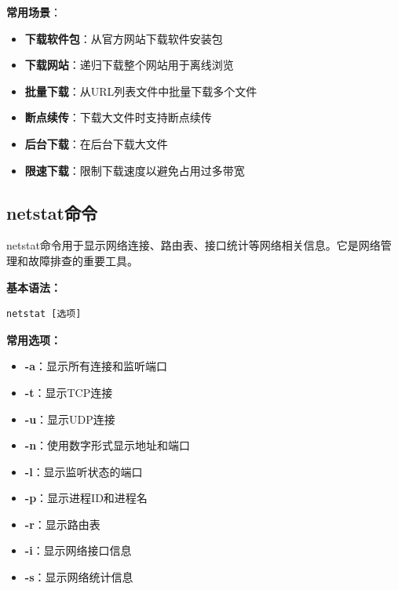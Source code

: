 \documentclass[12pt,UTF8]{ctexbook}
\begin{document}
\textbf{常用场景}：
\begin{itemize}
    \item \textbf{下载软件包}：从官方网站下载软件安装包
    \item \textbf{下载网站}：递归下载整个网站用于离线浏览
    \item \textbf{批量下载}：从URL列表文件中批量下载多个文件
    \item \textbf{断点续传}：下载大文件时支持断点续传
    \item \textbf{后台下载}：在后台下载大文件
    \item \textbf{限速下载}：限制下载速度以避免占用过多带宽
\end{itemize}

\subsection{netstat命令}
netstat命令用于显示网络连接、路由表、接口统计等网络相关信息。它是网络管理和故障排查的重要工具。

\textbf{基本语法：}
\begin{verbatim}
netstat [选项]
\end{verbatim}

\textbf{常用选项：}
\begin{itemize}
    \item \textbf{-a}：显示所有连接和监听端口
    \item \textbf{-t}：显示TCP连接
    \item \textbf{-u}：显示UDP连接
    \item \textbf{-n}：使用数字形式显示地址和端口
    \item \textbf{-l}：显示监听状态的端口
    \item \textbf{-p}：显示进程ID和进程名
    \item \textbf{-r}：显示路由表
    \item \textbf{-i}：显示网络接口信息
    \item \textbf{-s}：显示网络统计信息
\end{itemize}
\end{document}

